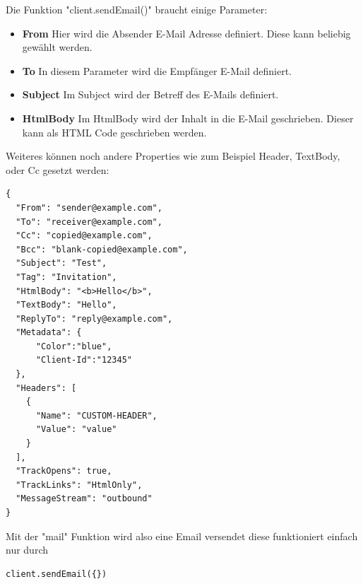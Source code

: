 Die Funktion "client.sendEmail()" braucht einige Parameter:

\begin{itemize}
    \item \textbf{From}
        \newline
        Hier wird die Absender E-Mail Adresse definiert. Diese kann beliebig gewählt werden.
    \item \textbf{To}
        \newline
        In diesem Parameter wird die Empfänger E-Mail definiert.
    \item \textbf{Subject}
        \newline
        Im Subject wird der Betreff des E-Mails definiert.
    \item \textbf{HtmlBody}
        \newline
        Im HtmlBody wird der Inhalt in die E-Mail geschrieben. Dieser kann als HTML Code geschrieben werden.
\end{itemize}


Weiteres können noch andere Properties wie zum Beispiel Header, TextBody, oder Cc gesetzt werden:

\begin{lstlisting}
{
  "From": "sender@example.com",
  "To": "receiver@example.com",
  "Cc": "copied@example.com",
  "Bcc": "blank-copied@example.com",
  "Subject": "Test",
  "Tag": "Invitation",
  "HtmlBody": "<b>Hello</b>",
  "TextBody": "Hello",
  "ReplyTo": "reply@example.com",
  "Metadata": {
      "Color":"blue",
      "Client-Id":"12345"
  },
  "Headers": [
    {
      "Name": "CUSTOM-HEADER",
      "Value": "value"
    }
  ],
  "TrackOpens": true,
  "TrackLinks": "HtmlOnly",
  "MessageStream": "outbound"
}
\end{lstlisting}







Mit der "mail" Funktion wird also eine Email versendet diese funktioniert einfach nur durch 
\begin{lstlisting}
client.sendEmail({})
\end{lstlisting}
